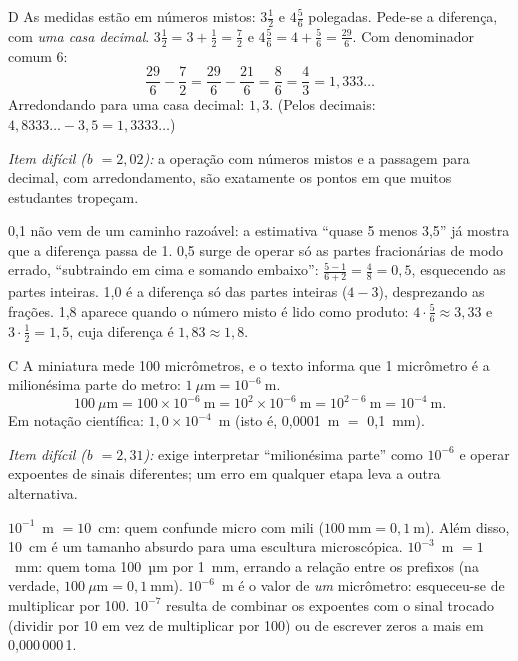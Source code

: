 \begin{resolucao}{D}
 As medidas estão em números mistos: $3\frac{1}{2}$ e $4\frac{5}{6}$
polegadas. Pede-se a diferença, com \emph{uma casa decimal}.
$3\frac{1}{2}=3+\frac{1}{2}=\frac{7}{2}$ \quad e \quad $4\frac{5}{6}=4+\frac{5}{6}=\frac{29}{6}$.
 Com denominador comum 6:
\[\frac{29}{6}-\frac{7}{2}=\frac{29}{6}-\frac{21}{6}=\frac{8}{6}=\frac{4}{3}=1,333\ldots\]
Arredondando para uma casa decimal: $1,3$.
(Pelos decimais: $4,8333\ldots-3,5=1,3333\ldots$)

\textit{Item difícil (b $=2,02$):} a operação com números mistos e a passagem para decimal, com
arredondamento, são exatamente os pontos em que muitos estudantes tropeçam.
\begin{distratores}
 0,1 não vem de um caminho razoável: a estimativa ``quase 5 menos 3,5'' já mostra que a
diferença passa de 1.
 0,5 surge de operar só as partes fracionárias de modo errado, ``subtraindo em cima e somando
embaixo'': $\frac{5-1}{6+2}=\frac{4}{8}=0,5$, esquecendo as partes inteiras.
 1,0 é a diferença só das partes inteiras ($4-3$), desprezando as frações.
 1,8 aparece quando o número misto é lido como produto: $4\cdot\frac{5}{6}\approx 3,33$ e
$3\cdot\frac{1}{2}=1,5$, cuja diferença é $1,83\approx 1,8$.
\end{distratores}
\end{resolucao}

\begin{resolucao}{C}
 A miniatura mede 100 micrômetros, e o texto informa que
1 micrômetro é a milionésima parte do metro: $1~\mu\text{m}=10^{-6}~\text{m}$.
\[100~\mu\text{m}=100\times 10^{-6}~\text{m}=10^{2}\times 10^{-6}~\text{m}=10^{2-6}~\text{m}=10^{-4}~\text{m}.\]
Em notação científica: $1,0\times 10^{-4}$~m (isto é, 0,0001~m $=$ 0,1~mm).

\textit{Item difícil (b $=2,31$):} exige interpretar ``milionésima parte'' como $10^{-6}$ e operar
expoentes de sinais diferentes; um erro em qualquer etapa leva a outra alternativa.
\begin{distratores}
 $10^{-1}$~m $=10$~cm: quem confunde micro com mili ($100~\text{mm}=0,1~\text{m}$). Além disso,
10~cm é um tamanho absurdo para uma escultura microscópica.
 $10^{-3}$~m $=1$~mm: quem toma 100~µm por 1~mm, errando a relação entre os prefixos
(na verdade, $100~\mu\text{m}=0,1~\text{mm}$).
 $10^{-6}$~m é o valor de \emph{um} micrômetro: esqueceu-se de multiplicar por 100.
 $10^{-7}$ resulta de combinar os expoentes com o sinal trocado (dividir por 10 em vez de
multiplicar por 100) ou de escrever zeros a mais em 0,000\,000\,1.
\end{distratores}
\end{resolucao}

